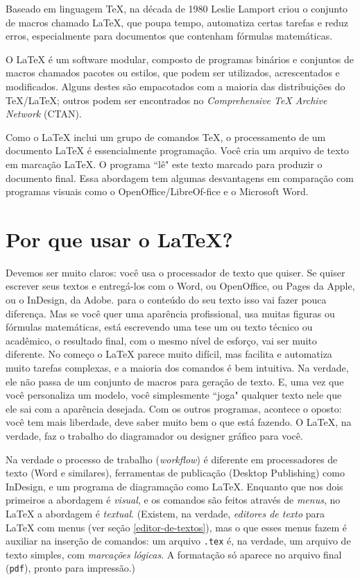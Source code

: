 \documentclass[a4paper,numbers=noenddot,abstract,DIV=calc]{scrbook} %
\begin{document}
Baseado em linguagem \TeX, na década de 1980 Leslie Lamport criou o conjunto de macros chamado \LaTeX, que poupa tempo, automatiza certas tarefas e reduz erros, especialmente para documentos que contenham fórmulas matemáticas.

O \LaTeX{} é um software modular, composto de programas binários e conjuntos de macros chamados pacotes ou estilos, que podem ser utilizados, acrescentados e modificados. Alguns destes são empacotados com a maioria das distribuições do TeX/\LaTeX; outros podem ser encontrados no \textit{Comprehensive TeX Archive Network} (CTAN).

Como o \LaTeX{} inclui um grupo de comandos TeX, o processamento de um documento \LaTeX{} é essencialmente programação. Você cria um arquivo de texto em marcação \LaTeX. O programa ``lê" este texto marcado para produzir o documento final.
Essa abordagem tem algumas desvantagens em comparação com programas visuais como o OpenOffice/Li\-bre\-Of-fice e o Microsoft Word.

\section{Por que usar o LaTeX?}

Devemos ser muito claros: você usa o processador de texto que quiser. Se quiser escrever seus textos e entregá-los com o Word, ou OpenOffice, ou Pages da Apple, ou o InDesign, da Adobe. para o conteúdo do seu texto isso vai fazer pouca diferença. Mas se você quer uma aparência profissional, usa muitas figuras ou fórmulas matemáticas, está escrevendo uma tese um ou texto técnico ou acadêmico, o resultado final, com o mesmo nível de esforço, vai ser muito diferente. No começo o \LaTeX{} parece muito difícil, mas facilita e automatiza muito tarefas complexas, e a maioria dos comandos é bem intuitiva. Na verdade, ele não passa de um conjunto de macros para geração de texto. E, uma vez que você personaliza um modelo, você simplesmente ``joga" qualquer texto nele que ele sai com a aparência desejada. Com os outros programas, acontece o oposto: você tem mais liberdade, deve saber muito bem o que está fazendo. O \LaTeX{}, na verdade, faz o trabalho do diagramador ou designer gráfico para você.

Na verdade o processo de trabalho (\textit{workflow}) é diferente em processadores de texto (Word e similares), ferramentas de publicação (Desktop Publishing) como InDesign, e um programa de diagramação como \LaTeX. Enquanto que nos dois primeiros a abordagem é \textit{visual}, e os comandos são feitos através de \textit{menus}, no \LaTeX{} a abordagem é \textit{textual}. (Existem, na verdade, \textit{editores de texto} para \LaTeX{} com menus (ver seção \ref{editor-de-textos}), mas o que esses menus fazem é auxiliar na inserção de comandos: um arquivo \texttt{.tex} é, na verdade, um arquivo de texto simples, com \textit{marcações lógicas}. A formatação só aparece no arquivo final (\texttt{pdf}), pronto para impressão.)
\end{document}

